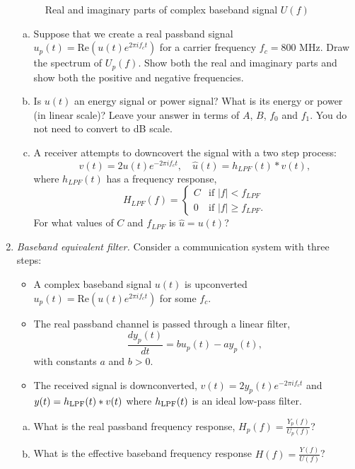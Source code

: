 \documentclass[11pt]{article}
\def\Real{\mathrm{Re}}
\begin{document}
\begin{enumerate}
\begin{figure}[h]
\caption{Real and imaginary parts of complex baseband signal $U(f)$} \label{fig:Ubb}
\end{figure}

\begin{enumerate}[(a)]


\item Suppose that we create a real passband signal $u_p(t) = \Real(u(t)e^{2\pi if_c t})$
for a carrier frequency $f_c = 800$ MHz.  Draw the spectrum of $U_p(f)$.  Show
 both the real and imaginary parts and show both the positive and negative frequencies.

\item Is $u(t)$ an energy signal or power signal?  What is its energy or power (in linear scale)?
Leave your answer in terms of $A$, $B$, $f_0$ and $f_1$.  You do not need to
convert to dB scale.

\item A receiver attempts to downcovert the signal with a two step process:
\[
    v(t)= 2u(t)e^{-2\pi i f_c t}, \quad \hat{u}(t) = h_{LPF}(t) * v(t),
\]
where $h_{LPF}(t)$ has a frequency response,
\[
    H_{LPF}(f) = \begin{cases}
        C & \mbox{if } |f| < f_{LPF} \\
        0 & \mbox{if } |f| \geq f_{LPF}.
        \end{cases}
\]
For what values of $C$ and $f_{LPF}$ is $\hat{u}=u(t)$?
\end{enumerate}

\item \emph{Baseband equivalent filter.}
Consider a communication system with three steps:
\begin{itemize}
\item A complex baseband signal $u(t)$ is upconverted $u_p(t)=\Real(u(t)e^{2\pi if_ct})$
for some $f_c$.
\item The real passband channel is passed through a linear filter,
\[
    \frac{dy_p(t)}{dt} = b u_p(t)- ay_p(t),
\]
with constants $a$ and $b>0$.
\item The received signal is downconverted, $v(t)=2y_p(t)e^{-2\pi i f_ct}$ and
$y(t)=h_{\rm LPF}(t)*v(t)$ where $h_{\rm LPF}(t)$ is an ideal low-pass filter.
\end{itemize}
\begin{enumerate}[(a)]
\item What is the real passband frequency response, $H_p(f) = \frac{Y_p(f)}{U_p(f)}$?

\item What is the effective baseband frequency response $H(f) = \frac{Y(f)}{U(f)}$?


\end{enumerate}
\end{enumerate}
\end{document}
